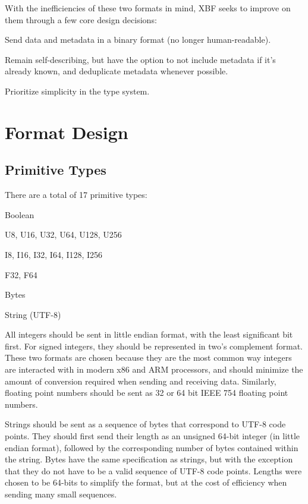 \documentclass[conference]{IEEEtran}
\begin{document}
With the inefficiencies of these two formats in mind, XBF seeks to improve on them through a few core design decisions:

\begin{IEEEitemize}
	\item Send data and metadata in a binary format (no longer human-readable).
	\item Remain self-describing, but have the option to not include metadata if it's already known, and deduplicate metadata whenever possible.
	\item Prioritize simplicity in the type system.
\end{IEEEitemize}

\section{Format Design}

\subsection{Primitive Types}

There are a total of 17  primitive types:

\begin{IEEEitemize}
	\item Boolean
	\item U8, U16, U32, U64, U128, U256
	\item I8, I16, I32, I64, I128, I256
	\item F32, F64
	\item Bytes
	\item String (UTF-8)
\end{IEEEitemize}

All integers should be sent in little endian format, with the least significant bit first. For signed integers, they should be represented in two's complement format. These two formats are chosen because they are the most common way integers are interacted with in modern x86 and ARM processors, and should minimize the amount of conversion required when sending and receiving data. Similarly, floating point numbers should be sent as 32 or 64 bit IEEE 754 floating point numbers.

Strings should be sent as a sequence of bytes that correspond to UTF-8 code points. They should first send their length as an unsigned 64-bit integer (in little endian format), followed by the corresponding number of bytes contained within the string. Bytes have the same specification as strings, but with the exception that they do not have to be a valid sequence of UTF-8 code points. Lengths were chosen to be 64-bits to simplify the format, but at the cost of efficiency when sending many small sequences.
\end{document}
